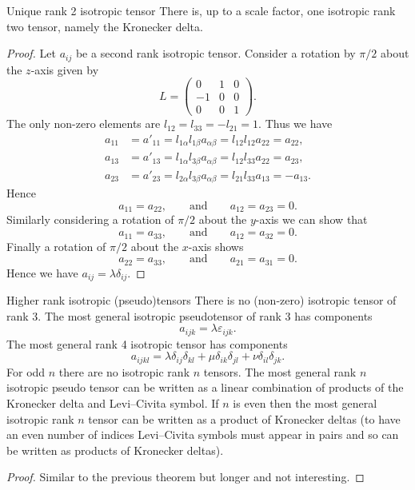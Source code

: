 \begin{theorem}{Unique rank 2 isotropic tensor}{}
    There is, up to a scale factor, one isotropic rank two tensor, namely the Kronecker delta.
\end{theorem}
\begin{proof}
    Let \(a_{ij}\) be a second rank isotropic tensor.
    Consider a rotation by \(\pi/2\) about the \(z\)-axis given by
    \[
    L =
    \begin{pmatrix}
        0 & 1 & 0\\
        -1 & 0 & 0\\
        0 & 0 & 1
    \end{pmatrix}
    .
    \]
    The only non-zero elements are \(l_{12} = l_{33} = -l_{21} = 1\).
    Thus we have
    \begin{align*}
        a_{11} &= a'_{11} = l_{1\alpha}l_{1\beta}a_{\alpha\beta} = l_{12}l_{12}a_{22} = a_{22},\\
        a_{13} &= a'_{13} = l_{1\alpha}l_{3\beta}a_{\alpha\beta} = l_{12}l_{33}a_{22} = a_{23},\\
        a_{23} &= a'_{23} = l_{2\alpha}l_{3\beta}a_{\alpha\beta} = l_{21}l_{33}a_{13} = -a_{13}.
    \end{align*}
    Hence
    \[a_{11} = a_{22}, \qquad\text{and}\qquad a_{12} = a_{23} = 0.\]
    Similarly considering a rotation of \(\pi/2\) about the \(y\)-axis we can show that 
    \[a_{11} = a_{33}, \qquad\text{and}\qquad a_{12} = a_{32} = 0.\]
    Finally a rotation of \(\pi/2\) about the \(x\)-axis shows
    \[a_{22} = a_{33}, \qquad\text{and}\qquad a_{21} = a_{31} = 0.\]
    Hence we have \(a_{ij} = \lambda \delta_{ij}\).
\end{proof}

\begin{theorem}{Higher rank isotropic (pseudo)tensors}{}
    There is no (non-zero) isotropic tensor of rank 3.
    The most general isotropic pseudotensor of rank 3 has components
    \[a_{ijk} = \lambda \varepsilon_{ijk}.\]
    The most general rank 4 isotropic tensor has components
    \[a_{ijkl} = \lambda\delta_{ij}\delta_{kl} + \mu\delta_{ik}\delta_{jl} + \nu\delta_{il}\delta_{jk}.\]
    For odd \(n\) there are no isotropic rank \(n\) tensors.
    The most general rank \(n\) isotropic pseudo tensor can be written as a linear combination of products of the Kronecker delta and Levi--Civita symbol.
    If \(n\) is even then the most general isotropic rank \(n\) tensor can be written as a product of Kronecker deltas (to have an even number of indices Levi--Civita symbols must appear in pairs and so can be written as products of Kronecker deltas).
\end{theorem} 
\begin{proof}
    Similar to the previous theorem but longer and not interesting.
    \phantom{\qedhere}  %
\end{proof}

